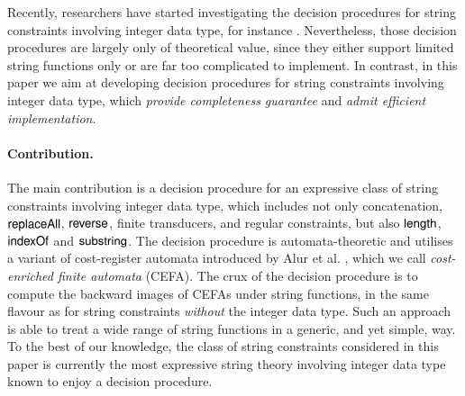 

Recently, researchers have started investigating the decision procedures for string constraints involving integer data type, for instance \cite{Vijay-length,LeH18,LinM18,LB16}. Nevertheless, those decision procedures are largely only of theoretical value, since they either support limited string functions only or are far too complicated to  implement. 
In contrast, in this paper we aim at developing decision procedures for string constraints involving integer data type, which %
\emph{provide completeness guarantee} and %
\emph{admit efficient implementation}.

\paragraph*{Contribution.} The main contribution is a decision procedure for an expressive class of string constraints involving  integer data type, which includes not only concatenation, $\mathsf{replaceAll}$, $\mathsf{reverse}$, finite transducers, and regular constraints, but also $\mathsf{length}$, $\mathsf{indexOf}$ and $\mathsf{substring}$. The decision procedure is automata-theoretic and utilises a variant of cost-register automata introduced by Alur et al. \cite{RLJ+13}, which we call \emph{cost-enriched finite automata} (CEFA). The crux of the decision procedure is to compute the backward images of CEFAs under string functions,  in the same flavour as \cite{CHL+19} for string constraints \emph{without} the integer data type. Such an approach %
is able to treat %
a wide range of string functions in a generic, and yet simple, way. To the best of our knowledge, the class of string constraints considered in this paper is currently the most expressive string theory involving integer data type known to enjoy a decision procedure. 

